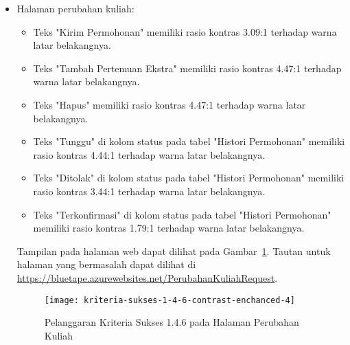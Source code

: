 \begin{itemize}
    \item Halaman perubahan kuliah: 
    \begin{itemize}
        \item Teks "Kirim Permohonan" memiliki rasio kontras 3.09:1 terhadap warna latar belakangnya.
        \item Teks "Tambah Pertemuan Ekstra" memiliki rasio kontras 4.47:1 terhadap warna latar belakangnya.
        \item Teks "Hapus" memiliki rasio kontras 4.47:1 terhadap warna latar belakangnya. 
        \item Teks "Tunggu" di kolom status pada tabel "Histori Permohonan" memiliki rasio kontras 4.44:1 terhadap warna latar belakangnya.
        \item Teks "Ditolak" di kolom status pada tabel "Histori Permohonan" memiliki rasio kontras 3.44:1 terhadap warna latar belakangnya.
        \item Teks "Terkonfirmasi" di kolom status pada tabel "Histori Permohonan" memiliki rasio kontras 1.79:1 terhadap warna latar belakangnya.
    \end{itemize}
    Tampilan pada halaman web dapat dilihat pada \mbox{Gambar \ref{fig:1.4.6_contrast_enchanced_4}}. Tautan untuk halaman yang bermasalah dapat dilihat di \url{https://bluetape.azurewebsites.net/PerubahanKuliahRequest}.
    \begin{figure}[H]
        \centering  
        \texttt{[image: kriteria-sukses-1-4-6-contrast-enchanced-4]}  
        \caption[Pelanggaran Kriteria Sukses 1.4.6 pada Halaman Perubahan Kuliah]{Pelanggaran Kriteria Sukses 1.4.6 pada Halaman Perubahan Kuliah}
        \label{fig:1.4.6_contrast_enchanced_4}  
    \end{figure} 
    

\end{itemize}

